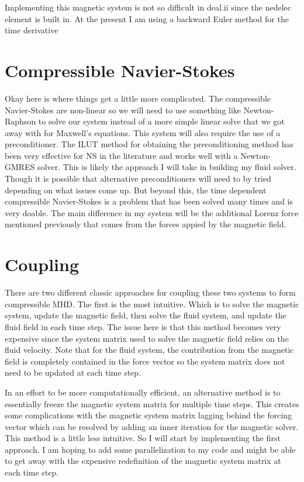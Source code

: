 \documentclass{article}
\begin{document}
Implementing this magnetic system is not so difficult in deal.ii since the nedelec element is built in. At the present I am using a backward Euler method for the time derivative

\section*{Compressible Navier-Stokes}
Okay here is where things get a little more complicated. The compressible Navier-Stokes are non-linear so we will need to use something like Newton-Raphson to solve our system instead of a more simple linear solve that we got away with for Maxwell's equations. This system will also require the use of a preconditioner. The ILUT method for obtaining the preconditioning method has been very effective for NS in the literature and works well with a Newton-GMRES solver. This is likely the approach I will take in building my fluid solver. Though it is possible that alternative preconditioners will need to by tried depending on what issues come up. But beyond this, the time dependent compressible Navier-Stokes is a problem that has been solved many times and is very doable. The main difference in my system will be the additional Lorenz force mentioned previously that comes from the forces appied by the magnetic field. 

\section*{Coupling}
There are two different classic approaches for coupling these two systems to form compressible MHD. The first is the most intuitive. Which is to solve the magnetic system, update the magnetic field, then solve the fluid system, and update the fluid field in each time step. The issue here is that this method becomes very expensive since the system matrix used to solve the magnetic field relies on the fluid velocity. Note that for the fluid system, the contribution from the magnetic field is completely contained in the force vector so the system matrix does not need to be updated at each time step. 

In an effort to be more computationally efficient, an alternative method is to essentially freeze the magnetic system matrix for multiple time steps. This creates some complications with the magnetic system matrix lagging behind the forcing vector which can be resolved by adding an inner iteration for the magnetic solver. This method is a little less intuitive. So I will start by implementing the first approach. I am hoping to add some parallelization to my code and might be able to get away with the expensive redefinition of the magnetic system matrix at each time step. 
\end{document}
